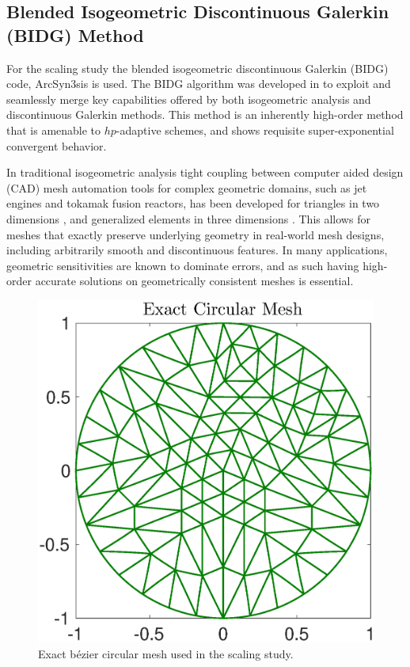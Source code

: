 \subsection{Blended Isogeometric Discontinuous Galerkin (BIDG) Method}
\label{sec:isogeometric}

For the scaling study the blended isogeometric discontinuous Galerkin (BIDG) code, ArcSyn3sis is used.  The BIDG algorithm was developed in \cite{Michoski2016658} to exploit and seamlessly merge key capabilities offered by both isogeometric analysis and discontinuous Galerkin methods. This method is an inherently high-order method that is amenable to $hp$-adaptive schemes, and shows requisite super-exponential convergent behavior.

In traditional isogeometric analysis tight coupling between computer aided design (CAD) mesh automation tools for complex geometric domains, such as jet engines and tokamak fusion reactors, has been developed for triangles in two dimensions \cite{Engvall2016378}, and generalized elements in three dimensions \cite{EngvallPress}.  This allows for meshes that exactly preserve underlying geometry in real-world mesh designs, including arbitrarily smooth and discontinuous features.  In many applications, geometric sensitivities are known to dominate errors, and as such having high-order accurate solutions on geometrically consistent meshes is essential.


\begin{figure}[h]
\begin{center}
\includegraphics[width=0.8\linewidth]{./bidg_data/168_circ}
\end{center}
\vspace*{-.5cm}
\caption{Exact b\'{e}zier circular mesh used in the scaling study.}
\label{fig:iso_circ}
\end{figure}


